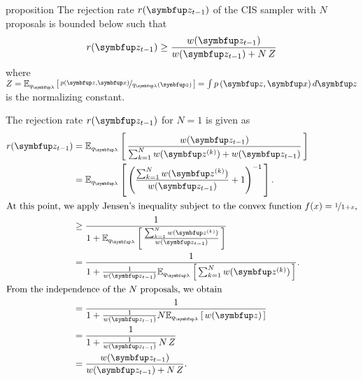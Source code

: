 
\begin{theoremEnd}[]{proposition}\label{thm:cis_bound}
  The rejection rate \(r(\vz_{t-1})\) of the CIS sampler with \(N\) proposals is bounded below such that
  \[
  r(\vz_{t-1}) \geq \frac{w(\vz_{t-1})}{w(\vz_{t-1}) + N\,Z}
  \]
  where \(Z=\Esub{q_{\vlambda}}{\nicefrac{p(\vz,\vx)}{q_{\vlambda}(\vz)}} = \int p\,(\vz,\vx)\,d\vz\) is the normalizing constant.
\end{theoremEnd}
\begin{proofEnd}
  The rejection rate \(r(\vz_{t-1})\) for \(N=1\) is given as
  \begin{align}
    r(\vz_{t-1})
    &= \Esub{q_{\vlambda}}{ \frac{w(\vz_{t-1})}{ \sum^{N}_{k=1} w(\vz^{(k)}) + w(\vz_{t-1})} } \\
    &= \Esub{q_{\vlambda}}{ {\left( \frac{\sum^{N}_{k=1} w(\vz^{(k)}) }{ w(\vz_{t-1}) } + 1 \right)}^{-1} }.  \\
\intertext{At this point, we apply Jensen's inequality subject to the convex function \(f(x) = \nicefrac{1}{1 + x}\),}
    &\geq \frac{1}{1 + \Esub{q_{\vlambda}}{ \frac{\sum^{N}_{k=1} w(\vz^{(k)})}{w(\vz_{t-1})} } } \\
    &=    \frac{1}{1 + \frac{1}{w(\vz_{t-1})} \Esub{q_{\vlambda}}{ \sum^{N}_{k=1} w(\vz^{(k)}) } }. \\
\intertext{From the independence of the \(N\) proposals, we obtain}
    &=    \frac{1}{1 + \frac{1}{w(\vz_{t-1})} N \Esub{q_{\vlambda}}{ w(\vz) } } \\
    &=    \frac{1}{1 + \frac{1}{w(\vz_{t-1})}\,N\,Z } \\
    &=    \frac{w(\vz_{t-1})}{w(\vz_{t-1}) + N\,Z}. \\
  \end{align}
\end{proofEnd}

